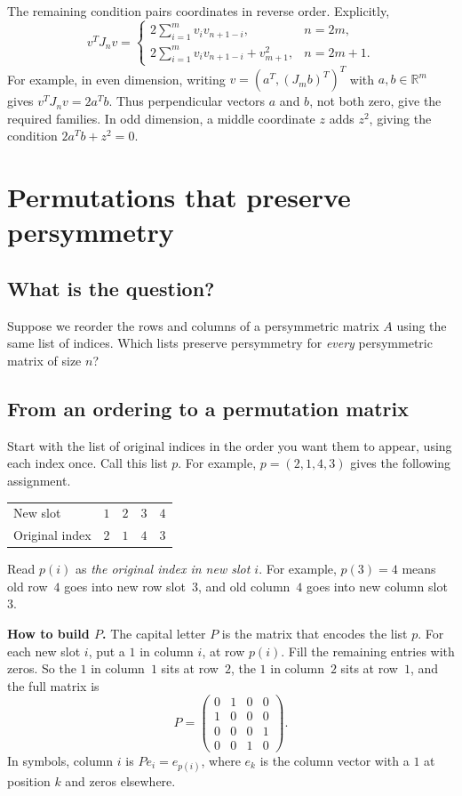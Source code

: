 \documentclass[11pt,a4paper]{article}
\begin{document}
The remaining condition pairs coordinates in reverse order. Explicitly,
\begin{equation}\label{eq:rank-one-coordinate-condition}
 v^TJ_nv=
 \begin{cases}
  2\displaystyle\sum_{i=1}^{m}v_i v_{n+1-i},&n=2m,\\[6pt]
  2\displaystyle\sum_{i=1}^{m}v_i v_{n+1-i}+v_{m+1}^2,&n=2m+1.
 \end{cases}
\end{equation}
For example, in even dimension, writing
$v=(a^T,(J_mb)^T)^T$ with $a,b\in\mathbb R^m$ gives
$v^TJ_nv=2a^Tb$. Thus perpendicular vectors $a$ and $b$, not both zero,
give the required families. In odd dimension, a middle coordinate $z$
adds $z^2$, giving the condition $2a^Tb+z^2=0$.

\newpage
\section{Permutations that preserve persymmetry}
\label{sec:persymmetry-permutations}

\subsection{What is the question?}
Suppose we reorder the rows and columns of a persymmetric matrix $A$
using the same list of indices. Which lists preserve persymmetry for
\emph{every} persymmetric matrix of size $n$?

\subsection{From an ordering to a permutation matrix}
\label{sec:permutation-matrix}
Start with the list of original indices in the order you want them to
appear, using each index once. Call this list $p$. For example,
$p=(2,1,4,3)$ gives the following assignment.
\begin{center}
\begin{tabular}{@{}lrrrr@{}}
 New slot & $1$ & $2$ & $3$ & $4$ \\
 Original index & $2$ & $1$ & $4$ & $3$
\end{tabular}
\end{center}
Read $p(i)$ as \emph{the original index in new slot $i$}. For example,
$p(3)=4$ means old row~$4$ goes into new row slot~$3$, and old column~$4$
goes into new column slot~$3$.

\textbf{How to build $P$.}
The capital letter $P$ is the matrix that encodes the list $p$. For each
new slot $i$, put a $1$ in column $i$, at row $p(i)$. Fill the remaining
entries with zeros. So the $1$ in column~$1$ sits at row~$2$, the $1$ in
column~$2$ sits at row~$1$, and the full matrix is
\[
 P=\begin{pmatrix}0&1&0&0\\1&0&0&0\\0&0&0&1\\0&0&1&0\end{pmatrix}.
\]
In symbols, column $i$ is $Pe_i=e_{p(i)}$, where $e_k$ is the column
vector with a $1$ at position $k$ and zeros elsewhere.
\end{document}
